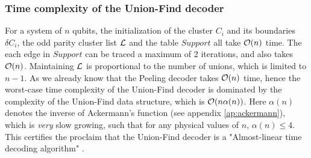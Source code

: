 \subsubsection{Time complexity of the Union-Find decoder}

For a system of $n$ qubits, the initialization of the cluster $C_i$ and its boundaries $\delta C_i$, the odd parity cluster list $\mathcal{L}$ and the table $Support$ all take $\mathcal{O}(n)$ time. The each edge in $Support$ can be traced a maximum of 2 iterations, and also takes $\mathcal{O}(n)$. Maintaining $\mathcal{L}$ is proportional to the number of unions, which is limited to $n-1$. As we already know that the Peeling decoder takes $\mathcal{O}(n)$ time, hence the worst-case time complexity of the Union-Find decoder is dominated by the complexity of the Union-Find data structure, which is $\mathcal{O}(n\alpha(n))$. Here $\alpha(n)$ denotes the inverse of Ackermann's function (see appendix \ref{ap:ackermann}), which is \emph{very} slow growing, such that for any physical values of $n$, $\alpha(n) \leq 4$. This certifies the proclaim that the Union-Find decoder is a "Almost-linear time decoding algorithm" \cite{delfosse2017almost}. 